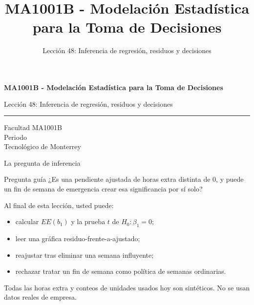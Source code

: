 \documentclass[aspectratio=169,10pt,spanish]{beamer}
\title{MA1001B - Modelación Estadística para la Toma de Decisiones}
\subtitle{Lección 48: Inferencia de regresión, residuos y decisiones}
\author{}
\institute{Tecnol\'ogico de Monterrey}
\date{}
\begin{document}
\begin{frame}[plain]
  \vspace{1.2cm}
  {\Large\bfseries MA1001B - Modelación Estadística para la Toma de Decisiones\par}
  \vspace{0.7cm}
  {\large Lección 48: Inferencia de regresión, residuos y decisiones\par}
  \vspace{0.7cm}
  {\color{TecRojo}\rule{\textwidth}{1.2pt}}
  \vspace{0.8cm}

  Facultad MA1001B\\[0.3cm]
  Periodo\\[0.3cm]
  Tecnol\'ogico de Monterrey
\end{frame}

\begin{frame}{La pregunta de inferencia}
  \begin{alertblock}{Pregunta guía}
    ¿Es una pendiente ajustada de horas extra distinta de 0, y puede un
    fin de semana de emergencia crear esa significancia por sí solo?
  \end{alertblock}

  \vspace{0.6em}
  Al final de esta lección, usted puede:
  \begin{itemize}
    \item calcular $EE(b_1)$ y la prueba $t$ de $H_0:\beta_1=0$;
    \item leer una gráfica residuo-frente-a-ajustado;
    \item reajustar tras eliminar una semana influyente;
    \item rechazar tratar un fin de semana como política de semanas
      ordinarias.
  \end{itemize}

  \vfill
  \scriptsize Todas las horas extra y conteos de unidades usados hoy son sintéticos. No se usan datos reales de empresa.
\end{frame}
\end{document}
